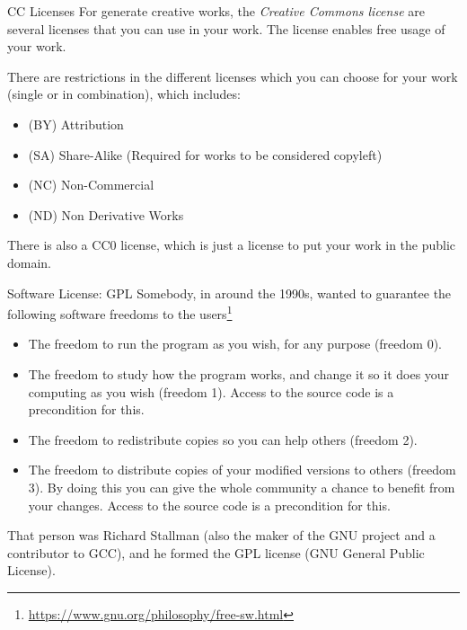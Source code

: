 \begin{frame}{CC Licenses}
  For generate creative works, the \textit{Creative Commons license} are several licenses that you can use in your work. The license enables free usage of your work.

  There are restrictions in the different licenses which you can choose for your work (single or in combination), which includes:
  \begin{itemize}
    \item (BY) Attribution
    \item (SA) Share-Alike (Required for works to be considered copyleft)
    \item (NC) Non-Commercial
    \item (ND) Non Derivative Works
  \end{itemize}

  There is also a CC0 license, which is just a license to put your work in the public domain.
\end{frame}

\begin{frame}{Software License: GPL}
  \footnotesize
  Somebody, in around the 1990s, wanted to guarantee the following software freedoms to the users\footnote{\url{https://www.gnu.org/philosophy/free-sw.html}}
  \begin{itemize}
    \item The freedom to run the program as you wish, for any purpose (freedom 0).
    \item The freedom to study how the program works, and change it so it does your computing as you wish (freedom 1). Access to the source code is a precondition for this.
    \item The freedom to redistribute copies so you can help others (freedom 2).
    \item The freedom to distribute copies of your modified versions to others (freedom 3). By doing this you can give the whole community a chance to benefit from your changes. Access to the source code is a precondition for this.
  \end{itemize}\pause

  That person was Richard Stallman (also the maker of the GNU project and a contributor to GCC), and he formed the GPL license (GNU General Public License).
\end{frame}

